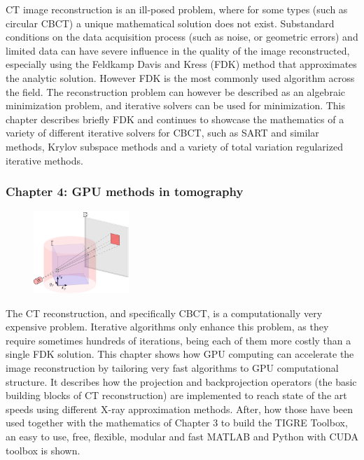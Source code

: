 CT image reconstruction is an ill-posed problem, where for some types (such as circular CBCT) a unique mathematical solution does not exist. Substandard conditions on the data acquisition process (such as noise, or geometric errors) and limited data can have severe influence in the quality of the image reconstructed, especially using the Feldkamp Davis and Kress (FDK) method that approximates the analytic solution. However FDK is the most commonly used algorithm across the field. The reconstruction problem can however be described as an algebraic minimization problem, and iterative solvers can be used for minimization. This chapter describes briefly FDK and continues to showcase the mathematics of a variety of different iterative solvers for CBCT, such as SART and similar methods, Krylov subspace methods and a variety of total variation regularized iterative methods.
\FloatBarrier
\subsubsection{Chapter 4: GPU methods in tomography}



\begin{figure}
\centering
\includegraphics[width=0.32\textwidth]{GPUmethods/projcoord-figure0.pdf}
\end{figure}

The CT reconstruction, and specifically CBCT, is a computationally very expensive problem. Iterative algorithms only enhance this problem, as they require sometimes hundreds of iterations, being each of them more costly than a single FDK solution. This chapter shows how GPU computing can accelerate the image reconstruction by tailoring very fast algorithms to GPU computational structure. It describes how the projection and backprojection operators (the basic building blocks of CT reconstruction) are implemented to reach state of the art speeds using different X-ray approximation methods. After, how those have been used together with the mathematics of Chapter 3 to build the TIGRE Toolbox, an easy to use, free, flexible, modular and fast MATLAB and Python with CUDA toolbox is shown. 
\FloatBarrier


